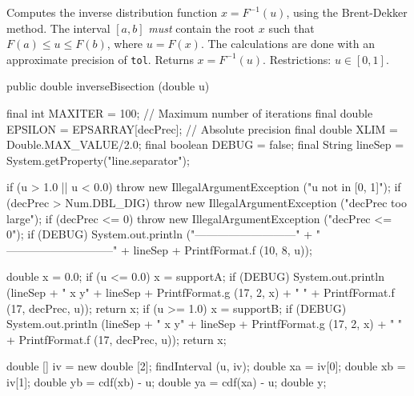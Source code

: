 \begin{tabb} Computes the inverse distribution function $x = F^{-1}(u)$,
    using the Brent-Dekker method. The interval $[a, b]$ \emph{must} contain
    the root $x$ such that $F(a) \le u \le F(b)$, where $u=F(x)$.
    The calculations are done with an approximate precision of \texttt{tol}.
    Returns $x = F^{-1}(u)$. Restrictions: $u \in [0,1]$.
\end{tabb}
\begin{htmlonly}
\end{htmlonly}
\begin{code}

   public double inverseBisection (double u)\begin{hide} {
      final int MAXITER = 100;              // Maximum number of iterations
      final double EPSILON = EPSARRAY[decPrec];  // Absolute precision
      final double XLIM =  Double.MAX_VALUE/2.0;
      final boolean DEBUG = false;
      final String lineSep = System.getProperty("line.separator");

      if (u > 1.0 || u < 0.0)
          throw new IllegalArgumentException ("u not in [0, 1]");
      if (decPrec > Num.DBL_DIG)
          throw new IllegalArgumentException ("decPrec too large");
      if (decPrec <= 0)
          throw new IllegalArgumentException ("decPrec <= 0");
      if (DEBUG) {
          System.out.println ("---------------------------" +
              " -----------------------------" + lineSep +
               PrintfFormat.f (10, 8, u));
      }

      double x = 0.0;
      if (u <= 0.0) {
          x = supportA;
          if (DEBUG) {
             System.out.println (lineSep + "            x                   y" +
                 lineSep + PrintfFormat.g (17, 2, x) + " " +
                 PrintfFormat.f (17, decPrec, u));
          }
          return x;
      }
      if (u >= 1.0) {
          x = supportB;
          if (DEBUG) {
             System.out.println (lineSep + "            x                   y" +
                            lineSep + PrintfFormat.g (17, 2, x) + " " +
                            PrintfFormat.f (17, decPrec, u));
          }
          return x;
      }

      double [] iv = new double [2];
      findInterval (u, iv);
      double xa = iv[0];
      double xb = iv[1];
      double yb = cdf(xb) - u;
      double ya = cdf(xa) - u;
      double y;

}
\end{hide}
\end{code}
